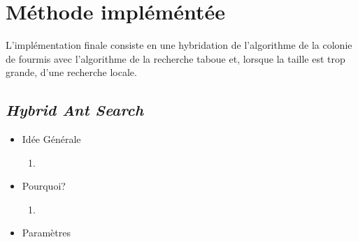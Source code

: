 \documentclass[b]{beamer}
\begin{document}
\section{Méthode impléméntée}
\begin{frame}
	L'implémentation finale consiste en une hybridation de l'algorithme de la colonie de fourmis avec l'algorithme de la recherche taboue et, lorsque la taille est trop grande, d'une recherche locale.
\end{frame}
\subsection{\emph{Hybrid Ant Search}}
\begin{frame}
	
	\begin{itemize}
		\item Idée Générale
		\begin{enumerate}
			\item 
		\end{enumerate}
		\item Pourquoi?
		\begin{enumerate}
			\item
		\end{enumerate}
		\item Paramètres
	\end{itemize}
\end{frame}
\end{document}

